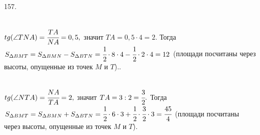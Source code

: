 \documentclass[12pt]{article}
\begin{document}
157. \begin{figure}[ht!]
\end{figure}\\
$tg(\angle TNA)=\cfrac{TA}{NA}=0,5,$ значит $TA=0,5\cdot4=2.$ Тогда $S_{\Delta BMT}=S_{\Delta BMN}-S_{\Delta BTN}=\cfrac{1}{2}\cdot8\cdot4-\cfrac{1}{2}\cdot2\cdot4=12$ (площади посчитаны через высоты, опущенные из точек $M$ и $T$).\newpage{}. \begin{figure}[ht!]
\end{figure}\\
$tg(\angle NTA)=\cfrac{NA}{TA}=2,$ значит $TA=3:2=\cfrac{3}{2}.$ Тогда $S_{\Delta BMT}=S_{\Delta BMN}+S_{\Delta BTN}=\cfrac{1}{2}\cdot6\cdot3+\cfrac{1}{2}\cdot\cfrac{3}{2}\cdot3=\cfrac{45}{4}$ (площади посчитаны через высоты, опущенные из точек $M$ и $T$).\\
\end{document}
